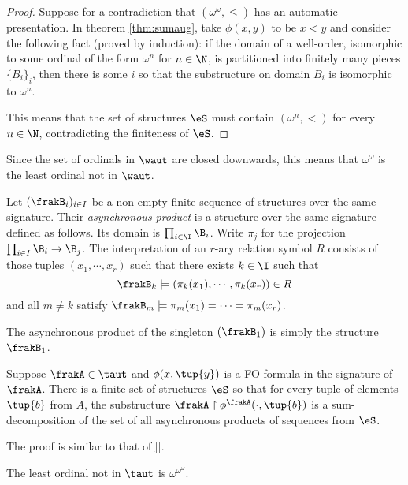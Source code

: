 \begin{proof}
Suppose for a contradiction that $(\omega^\omega,\leq)$ has an automatic presentation.
In theorem \ref{thm:sumaug}, take $\phi(x,y)$ to be $x < y$ and
consider the following fact (proved by induction): if the domain of a well-order,
isomorphic to some ordinal of the form $\omega^n$ for $n \in \N$, is
partitioned into finitely many pieces $\{B_i\}_i$, then there is some $i$ so
that the substructure on domain $B_i$ is isomorphic to $\omega^n$.

This means that the set of structures $\eS$ must contain $(\omega^n,<)$ for every $n \in \N$, contradicting
the finiteness of $\eS$.
\end{proof}

Since the set of ordinals in $\waut$ are closed downwards, this means that $\omega^\omega$ is the least ordinal not in $\waut$.

\begin{definition}
Let $(\frakB_i)_{i \in I}$ be a non-empty finite sequence of structures over the same signature. Their {\em asynchronous product} is a structure over the same signature 
defined as follows. Its domain is $\prod_{i \in \I} \B_i$. Write $\pi_j$ for the projection $\prod_{i \in I} \B_i \to \B_j$. The interpretation of an $r$-ary relation symbol $R$
consists of those tuples $(x_1,\cdots,x_r)$ such that there exists $k \in \I$ such that
\[
\frakB_k \models (\pi_k(x_1),\cdots,\pi_k(x_r)) \in R
\]
and all $m \neq k$ satisfy $\frakB_m \models \pi_m(x_1) = \cdots = \pi_m(x_r)$.
\end{definition}

The asynchronous product of the singleton $(\frakB_1)$ is simply the structure $\frakB_1$. 

\begin{theorem}
Suppose $\frakA \in \taut$ and $\phi(x,\tup{y})$ is a FO-formula in the signature of $\frakA$.
There is a finite set of structures $\eS$ so that for every tuple of elements $\tup{b}$ from $A$, the
substructure ${\frakA} \restriction \phi^{\frakA}(\cdot,\tup{b})$ is a sum-decomposition of the set
of all asynchronous products of sequences from $\eS$.
\end{theorem}

The proof is similar to that of \ref{}.

\begin{corollary}
The least ordinal not in $\taut$ is $\omega^{\omega^{\omega}}$.
\end{corollary}


